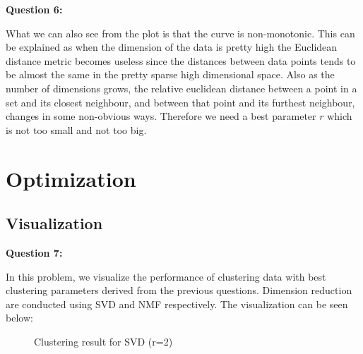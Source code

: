 \documentclass[runningheads]{llncs}
\begin{document}
\textbf{Question 6:}

What we can also see from the plot is that the curve is non-monotonic. This can be explained as when the dimension of the data is pretty high the Euclidean distance metric becomes useless since the distances between data points tends to be almost the same in the pretty sparse high dimensional space. Also as the number of dimensions grows, the relative euclidean distance between a point in a set and its closest neighbour, and between that point and its furthest neighbour, changes in some non-obvious ways. Therefore we need a best parameter $r$ which is not too small and not too big.

\section{Optimization}

\subsection{Visualization}

\textbf{Question 7:}

In this problem, we visualize the performance of clustering data with best clustering parameters derived from the previous questions. Dimension reduction are conducted using SVD and NMF respectively. The visualization can be seen below:

\begin{figure}
\centering
{}
\caption{Clustering result for SVD (r=2)} \label{Q7_SVD}
\end{figure}
\end{document}
